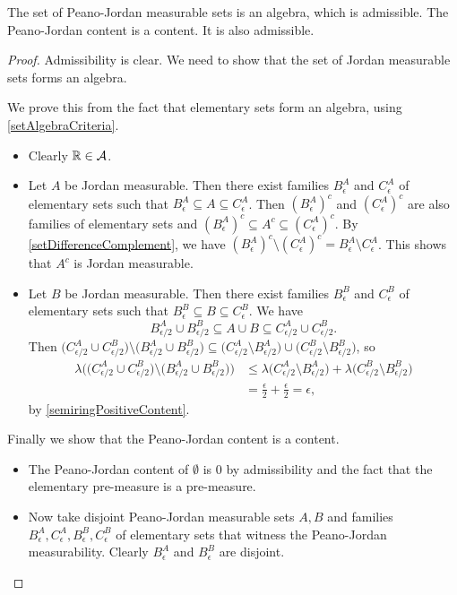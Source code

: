 \begin{lemma} \label{PeanoJordanAlgebra}
The set of Peano-Jordan measurable sets is an algebra, which is admissible. The Peano-Jordan content is a content. It is also admissible.
\end{lemma}
\begin{proof}
Admissibility is clear. We need to show that the set of Jordan measurable sets forms an algebra.

We prove this from the fact that elementary sets form an algebra, using \ref{setAlgebraCriteria}.

\begin{itemize}
\item Clearly $\mathbb{R}\in\mathcal{A}$.
\item Let $A$ be Jordan measurable. Then there exist families $B_\epsilon^A$ and $C_\epsilon^{A}$ of elementary sets such that $B_\epsilon^A \subseteq A \subseteq C_\epsilon^{A}$. Then $(B_\epsilon^A)^c$ and $(C_\epsilon^{A})^c$ are also families of elementary sets and $(B_\epsilon^A)^c \subseteq A^c \subseteq (C_\epsilon^{A})^c$. By \ref{setDifferenceComplement}, we have $(B_\epsilon^A)^c \setminus (C_\epsilon^{A})^c = B_\epsilon^A \setminus C_\epsilon^{A}$. This shows that $A^c$ is Jordan measurable.
\item Let $B$ be Jordan measurable. Then there exist families $B_\epsilon^B$ and $C_\epsilon^{B}$ of elementary sets such that $B_\epsilon^B \subseteq B \subseteq C_\epsilon^{B}$. We have
\[ B_{\epsilon/2}^A \cup B_{\epsilon/2}^B \subseteq A\cup B \subseteq C_{\epsilon/2}^A \cup C_{\epsilon/2}^B. \]
Then $\big(C_{\epsilon/2}^A \cup C_{\epsilon/2}^B\big) \setminus \big(B_{\epsilon/2}^A \cup B_{\epsilon/2}^B\big) \subseteq \big(C_{\epsilon/2}^A \setminus B_{\epsilon/2}^A\big) \cup \big(C_{\epsilon/2}^B \setminus B_{\epsilon/2}^B\big)$, so
\begin{align*}
\lambda\Big(\big(C_{\epsilon/2}^A \cup C_{\epsilon/2}^B\big) \setminus \big(B_{\epsilon/2}^A \cup B_{\epsilon/2}^B\big)\Big) &\leq \lambda\big(C_{\epsilon/2}^A \setminus B_{\epsilon/2}^A\big) + \lambda\big(C_{\epsilon/2}^B \setminus B_{\epsilon/2}^B\big) \\
&= \frac{\epsilon}{2} + \frac{\epsilon}{2} = \epsilon,
\end{align*}
by \ref{semiringPositiveContent}.
\end{itemize}

Finally we show that the Peano-Jordan content is a content.
\begin{itemize}
\item The Peano-Jordan content of $\emptyset$ is $0$ by admissibility and the fact that the elementary pre-measure is a pre-measure.
\item Now take disjoint Peano-Jordan measurable sets $A,B$ and families $B_\epsilon^A, C_\epsilon^A, B_\epsilon^B, C_\epsilon^B$ of elementary sets that witness the Peano-Jordan measurability. Clearly $B_\epsilon^A$ and $B_\epsilon^B$ are disjoint.


\end{itemize}
\end{proof}
